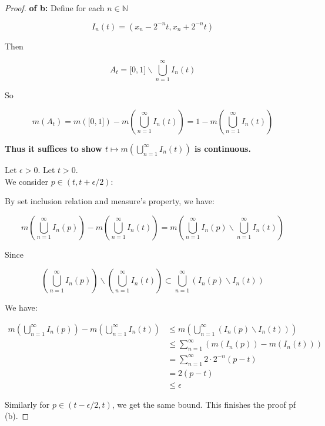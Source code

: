 \documentclass{qlnotes-export}
\begin{document}
\begin{proof}

\textbf{of b:} Define for each \(n \in {\mathbb{N}}\)

\[I_{n}(t) = (x_{n} - 2^{- n}t,x_{n} + 2^{- n}t)\]

Then

\[A_{t} = \lbrack 0,1\rbrack\backslash\bigcup\limits_{n = 1}^{\infty}I_{n}(t)\]

So

\[m(A_{t}) = m(\lbrack 0,1\rbrack) - m(\bigcup\limits_{n = 1}^{\infty}I_{n}(t)) = 1 - m(\bigcup\limits_{n = 1}^{\infty}I_{n}(t))\]

\textbf{Thus it suffices to show \(t\mapsto m(\bigcup_{n = 1}^{\infty}I_{n}(t))\) is continuous.}

Let \(\epsilon > 0\). Let \(t > 0\).\\
We consider \(p \in (t,t + \epsilon/2)\):

By set inclusion relation and measure's property, we have:

\[m(\bigcup\limits_{n = 1}^{\infty}I_{n}(p)) - m(\bigcup\limits_{n = 1}^{\infty}I_{n}(t)) = m(\bigcup\limits_{n = 1}^{\infty}I_{n}(p)\backslash\bigcup\limits_{n = 1}^{\infty}I_{n}(t))\]

Since

\[(\bigcup\limits_{n = 1}^{\infty}I_{n}(p))\backslash(\bigcup\limits_{n = 1}^{\infty}I_{n}(t)) \subset \bigcup\limits_{n = 1}^{\infty}(I_{n}(p)\backslash I_{n}(t))\]

We have:

\[\begin{matrix}
{m(\bigcup\limits_{n = 1}^{\infty}I_{n}(p)) - m(\bigcup\limits_{n = 1}^{\infty}I_{n}(t))} & {\leq m(\bigcup\limits_{n = 1}^{\infty}(I_{n}(p)\backslash I_{n}(t)))} \\
 & {\leq \sum\limits_{n = 1}^{\infty}(m(I_{n}(p)) - m(I_{n}(t)))} \\
 & {= \sum\limits_{n = 1}^{\infty}2 \cdot 2^{- n}(p - t)} \\
 & {= 2(p - t)} \\
 & {\leq \epsilon}
\end{matrix}\]

Similarly for \(p \in (t - \epsilon/2,t)\), we get the same bound. This finishes the proof pf (b).

\end{proof}
\end{document}
